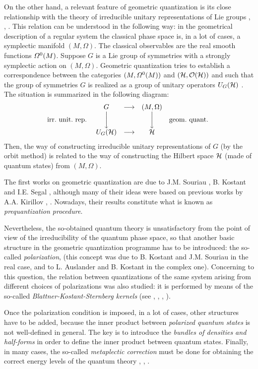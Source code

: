 \documentclass[12pt]{article}
\def\H{{\cal H}}
\begin{document}
On the other hand, a relevant feature
of geometric quantization is its close relationship
with the theory of irreducible unitary representations of Lie groups
\cite{AK-71}, \cite{Ki-62}, \cite{Ko-70}.
This relation can be understood in the following way:
in the geometrical description of a regular system
the classical phase space is, in a lot of cases, a symplectic manifold
$(M,\Omega )$. The classical observables are the real smooth
functions ${\mit\Omega}^0(M)$. Suppose $G$ is a Lie group of symmetries
with a strongly symplectic action on $(M,\Omega )$.
Geometric quantization tries to establish a correspondence between the
categories
$(M,{\mit\Omega}^0(M))$ and $(\H ,{\cal O}(\H ))$
and such that the group of symmetries $G$
is realized as a group of unitary operators $U_G(\H )$ \cite{Go-80}.
The situation is summarized in the following diagram:
$$
\begin{array}{ccccc}
& G & \longrightarrow & (M,\Omega ) &
\\
{\rm irr. \ unit. \ rep. \ } & \bigg\downarrow & &
\bigg\downarrow & {\rm geom. \ quant.\ }
\\
& U_G(\H ) & \longrightarrow & \H &
\end{array}
$$
Then, the way of constructing irreducible unitary representations
of $G$ (by the orbit method) is related to the way of constructing the
Hilbert space $\H$
(made of quantum states) from $(M,\Omega )$.

The first works on geometric quantization
are due to J.M. Souriau \cite{So-69}, B. Kostant \cite{Ko-70} and I.E.
Segal \cite{Se-60},
although many of their ideas were based on
previous works by A.A. Kirillov \cite{Ki-62}, \cite{Ki-76}.
Nowadays, their results constitute what is known as {\it prequantization
procedure}.

Nevertheless, the so-obtained quantum theory is unsatisfactory
 from the point of view of the irreducibility of the
quantum phase space, so that another basic structure
in the geometric quantization programme has to be introduced:
the so-called {\it polarization},
(this concept was due to B. Kostant and J.M. Souriau in the real case,
and to L. Auslander and B. Kostant in the complex one).
Concerning to this question, the relation between  quantizations of the
same
system arising from different choices of polarizations
was also studied: it is performed by means of the so-called
{\it Blattner-Kostant-Sternberg kernels}
(see \cite{Bl-73}, \cite{Bl-75}, \cite{Bl-77}, \cite{GS-77}).

Once the polarization condition is imposed,
in a lot of cases, other structures have to be added,
because  the inner product between {\it polarized quantum states}
is not well-defined in general.
The key is to introduce the {\it bundles of densities and half-forms}
\cite{Wn-77}
in order to define the inner product between quantum states.
Finally, in many cases, the so-called {\it metaplectic correction} must
be done
for obtaining the correct energy levels of the quantum theory
\cite{Bl-73}, \cite{GS-77}, \cite{Ko-74}.
\end{document}
